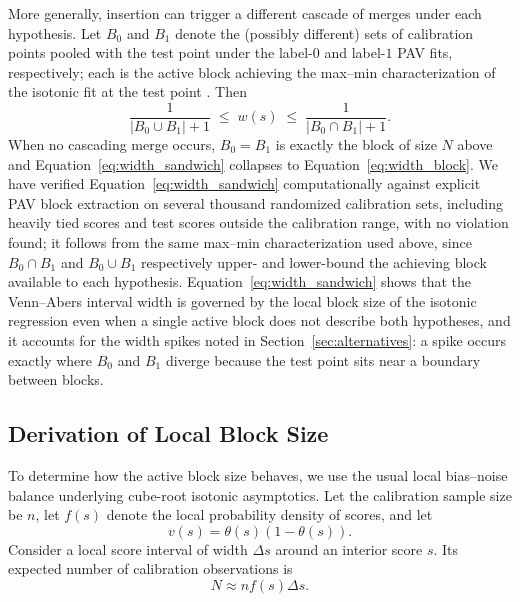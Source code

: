 \documentclass[11pt]{article}
\begin{document}
	More generally, insertion can trigger a different cascade of merges under each hypothesis. Let $B_0$ and $B_1$ denote the (possibly different) sets of calibration points pooled with the test point under the label-$0$ and label-$1$ PAV fits, respectively; each is the active block achieving the max--min characterization of the isotonic fit at the test point \cite{robertson1988}. Then
	\begin{equation}
		\frac{1}{|B_0 \cup B_1| + 1} \;\le\; w(s) \;\le\; \frac{1}{|B_0 \cap B_1| + 1}.
		\label{eq:width_sandwich}
	\end{equation}
	When no cascading merge occurs, $B_0=B_1$ is exactly the block of size $N$ above and Equation~\ref{eq:width_sandwich} collapses to Equation~\ref{eq:width_block}. We have verified Equation~\ref{eq:width_sandwich} computationally against explicit PAV block extraction on several thousand randomized calibration sets, including heavily tied scores and test scores outside the calibration range, with no violation found; it follows from the same max--min characterization used above, since $B_0\cap B_1$ and $B_0\cup B_1$ respectively upper- and lower-bound the achieving block available to each hypothesis. Equation~\ref{eq:width_sandwich} shows that the Venn--Abers interval width is governed by the local block size of the isotonic regression even when a single active block does not describe both hypotheses, and it accounts for the width spikes noted in Section~\ref{sec:alternatives}: a spike occurs exactly where $B_0$ and $B_1$ diverge because the test point sits near a boundary between blocks.
	
	\subsection{Derivation of Local Block Size}
	
	To determine how the active block size behaves, we use the usual local bias--noise balance underlying cube-root isotonic asymptotics. Let the calibration sample size be $n$, let $f(s)$ denote the local probability density of scores, and let
	\begin{equation}
		v(s)=\theta(s)(1-\theta(s)).
	\end{equation}
	Consider a local score interval of width $\Delta s$ around an interior score $s$. Its expected number of calibration observations is
	\begin{equation}
		N \approx n f(s)\Delta s.
		\label{eq:block_count_n}
	\end{equation}
	
\end{document}
